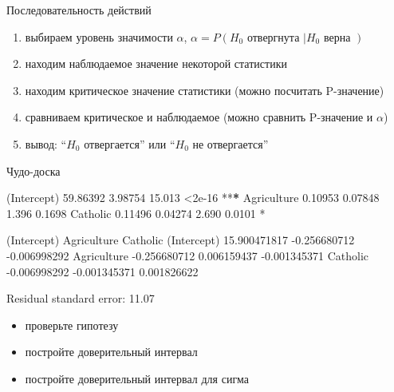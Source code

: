 \documentclass[ignorenonframetext,]{beamer}
\newenvironment{Shaded}{\begin{snugshade}}{\end{snugshade}}
\newcommand{\FloatTok}[1]{\textcolor[rgb]{0.00,0.00,0.81}{{#1}}}
\newcommand{\StringTok}[1]{\textcolor[rgb]{0.31,0.60,0.02}{{#1}}}
\newcommand{\ErrorTok}[1]{\textbf{{#1}}}
\newcommand{\NormalTok}[1]{{#1}}
\begin{document}
\begin{frame}{Последовательность действий}

\begin{enumerate}
\def\labelenumi{\arabic{enumi}.}
\itemsep1pt\parskip0pt
\item
  выбираем уровень значимости $\alpha$,
  $\alpha=P(H_0 \text{ отвергнута }| H_0 \text{ верна })$
\item
  находим наблюдаемое значение некоторой статистики
\item
  находим критическое значение статистики (можно посчитать P-значение)
\item
  сравниваем критическое и наблюдаемое (можно сравнить P-значение и
  $\alpha$)
\item
  вывод: ``$H_0$ отвергается'' или ``$H_0$ не отвергается''
\end{enumerate}

\end{frame}

\begin{frame}[fragile]{Чудо-доска}

\begin{Shaded}
\begin{Highlighting}[]
\NormalTok{(Intercept) }\FloatTok{59.86392}    \FloatTok{3.98754}  \FloatTok{15.013}   \NormalTok{<}\FloatTok{2e-16} \NormalTok{**}\ErrorTok{*}
\NormalTok{Agriculture  }\FloatTok{0.10953}    \FloatTok{0.07848}   \FloatTok{1.396}   \FloatTok{0.1698}    
\NormalTok{Catholic     }\FloatTok{0.11496}    \FloatTok{0.04274}   \FloatTok{2.690}   \FloatTok{0.0101} \NormalTok{*}\StringTok{ }

\StringTok{             }\NormalTok{(Intercept)  Agriculture     Catholic}
\NormalTok{(Intercept) }\FloatTok{15.900471817} \NormalTok{-}\FloatTok{0.256680712} \NormalTok{-}\FloatTok{0.006998292}
\NormalTok{Agriculture -}\FloatTok{0.256680712}  \FloatTok{0.006159437} \NormalTok{-}\FloatTok{0.001345371}
\NormalTok{Catholic    -}\FloatTok{0.006998292} \NormalTok{-}\FloatTok{0.001345371}  \FloatTok{0.001826622}

\NormalTok{Residual standard error:}\StringTok{ }\FloatTok{11.07}
\end{Highlighting}
\end{Shaded}

\begin{itemize}
\itemsep1pt\parskip0pt
\item
  проверьте гипотезу
\item
  постройте доверительный интервал
\item
  постройте доверительный интервал для сигма
\end{itemize}

\end{frame}
\end{document}
